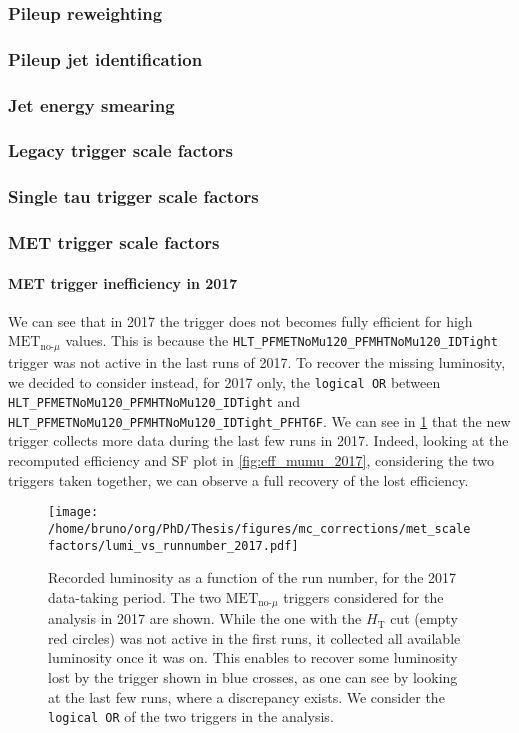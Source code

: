 \documentclass[11pt]{article}
\newcommand{\httt}{H_{\text{T}}}
\newcommand{\metnomu}{\text{MET}_{\text{no-}\mu}}
\newcommand{\logicor}[1]{\texttt{logical~OR}}
\begin{document}
\subsubsection{Pileup reweighting}
\label{sec:org8829c64}
\subsubsection{Pileup jet identification}
\label{sec:orgaf01b30}
\subsubsection{Jet energy smearing}
\label{sec:orgc898b20}
\subsubsection{Legacy trigger scale factors}
\label{sec:org04c0f6e}
\subsubsection{Single tau trigger scale factors}
\label{sec:org63466fc}
\subsubsection{MET trigger scale factors}
\label{sec:org75a181e}
\paragraph{MET trigger inefficiency in 2017}

We can see that in 2017 the trigger does not becomes fully efficient for high \(\metnomu\) values.
This is because the \texttt{HLT\_PFMETNoMu120\_PFMHTNoMu120\_IDTight} trigger was not active in the last runs of 2017.
To recover the missing luminosity, we decided to consider instead, for 2017 only, the \logicor{} between \texttt{HLT\_PFMETNoMu120\_PFMHTNoMu120\_IDTight} and \texttt{HLT\_PFMETNoMu120\_PFMHTNoMu120\_IDTight\_PFHT6F}.
We can see in \cref{fig:lumi_vs_runnumber_2017} that the new trigger collects more data during the last few runs in 2017.
Indeed, looking at the recomputed efficiency and SF plot in \cref{fig:eff_mumu_2017}, considering the two triggers taken together, we can observe a full recovery of the lost efficiency.

\begin{figure}
\texttt{[image: /home/bruno/org/PhD/Thesis/figures/mc\_corrections/met\_scalefactors/lumi\_vs\_runnumber\_2017.pdf]}
\caption{\label{fig:lumi_vs_runnumber_2017}Recorded luminosity as a function of the run number, for the 2017 data-taking period. The two \(\metnomu\) triggers considered for the analysis in 2017 are shown. While the one with the \(\httt\) cut (empty red circles) was not active in the first runs,  it collected all available luminosity once it was on. This enables to recover some luminosity lost by the trigger shown in blue crosses, as one can see by looking at the last few runs, where a discrepancy exists. We consider the \logicor{} of the two triggers in the analysis.}
\end{figure}
\end{document}
